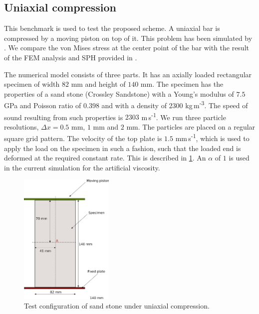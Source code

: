 %
%
%
%
\FloatBarrier%
\subsection{Uniaxial compression}
\label{sec:uniaxial-compression}

This benchmark is used to test the proposed scheme. A uniaxial bar is
compressed by a moving piston on top of it. This problem has been simulated by
\cite{das2015evaluation}. We compare the von Mises stress at the center point
of the bar with the result of the FEM analysis and SPH provided in
\citep{das2015evaluation}.

The numerical model consists of three parts. It has an axially loaded
rectangular specimen of width $82$ mm and height of $140$ mm. The specimen has
the properties of a sand stone (Crossley Sandstone) with a Young's modulus of
$7.5$ GPa and Poisson ratio of $0.398$ and with a density of $2300$
kg\,m\textsuperscript{-3}. The speed of sound resulting from such properties is
$2303$ m\,s\textsuperscript{-1}. We run three particle resolutions,
$\Delta x = 0.5$ mm, $1$ mm and $2$ mm. The particles are placed on a regular
square grid pattern. The velocity of the top plate is
$1.5$ mm\,s\textsuperscript{-1}, which is used to apply the load on the specimen in
such a fashion, such that the loaded end is deformed at the required constant
rate. This is described in \cref{fig:uniaxial_test_configuration}. An $\alpha$
of $1$ is used in the current simulation for the artificial viscosity.

\begin{figure}[!htp]
  \centering
  \includegraphics[width=0.4\textwidth]{images/ctvf/images/uniaxial_compression/uniaxial_compression}
  \caption{Test configuration of sand stone under uniaxial compression.}
\label{fig:uniaxial_test_configuration}
\end{figure}


